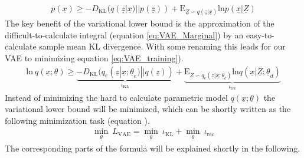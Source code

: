 \documentclass[12pt,DIV14,BCOR12mm,a4paper,footexclude,headinclude,halfparskip-,twoside,openright,cleardoubleempty,idxtotoc,bibtotoc,listtotoc]{scrreprt} %
\numberwithin{equation}{chapter}
\begin{document}
\begin{align}
	 p(\underline{x}) \geq -D_{\textrm{KL}}(q(\underline{z}|\underline{x})||p(\underline{z}))+\textrm{E}_{\underline{Z}\backsim q(\underline{z}|\underline{x})}\textrm{ln}p(\underline{x}|\underline{Z})\label{eq:Variational_Lower_Bound}
\end{align}
The key benefit of the variational lower bound is the approximation of the difficult-to-calculate integral (equation \ref{eq:VAE_Marginal}) by an easy-to-calculate sample mean KL divergence. With some renaming this leads for our VAE to minimizing equation \ref{eq:VAE_training}).
\begin{align}
	 \textrm{ln}\ q(\underline{x};\underline{\theta}) \geq \underbrace{-D_{\textrm{KL}}(q_e(\underline{z}|\underline{x};\underline{\theta}_e)||q(\underline{z}))}_{\iota_{\textrm{KL}}}+\underbrace{\textrm{E}_{\underline{Z}\backsim q_e(\underline{z}|\underline{x};\underline{\theta}_e)}\textrm{ln}q(\underline{x}|\underline{Z};\underline{\theta}_d)}_{\iota_{\textrm{rec}}}\label{eq:VAE_training}
\end{align}
Instead of minimizing the hard to calculate parametric model $q(\underline{x};\underline{\theta})$ the variational lower bound will be minimized, which can be shortly written as the following minimization task (equation ).
\begin{align}
	\underset{\underline{\theta}}\min\ L_{\textrm{VAE}} = \underset{\underline{\theta}}\min\ \iota_{\textrm{KL}} + \underset{\underline{\theta}}\min\ \iota_{\textrm{rec}}\label{eq:VAE_Min}
\end{align}
The corresponding parts of the formula will be explained shortly in the following.
\end{document}

